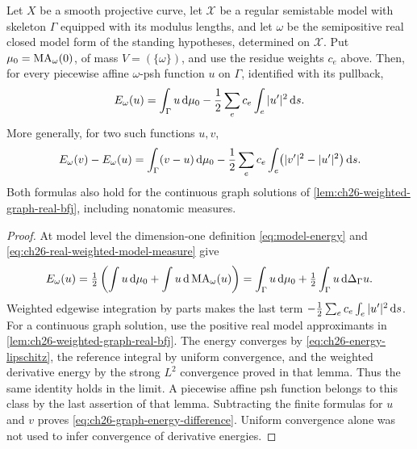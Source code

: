 \begin{proposition}
\label{prop:ch26-graph-energy}
Let \(X\) be a smooth projective curve, let \(\mathcal X\) be a regular
semistable model with skeleton \(\Gamma\) equipped with its modulus lengths,
and let \(\omega\) be the semipositive real closed model form of the
standing hypotheses, determined on \(\mathcal X\).  Put
\(\mu_0=\operatorname{MA}_\omega(0)\), of mass \(V=(\{\omega\})\), and use the
residue weights \(c_e\) above.  Then, for every piecewise affine
\(\omega\)-psh function \(u\) on \(\Gamma\), identified with its pullback,
\begin{equation}
\label{eq:ch26-graph-energy}
 E_\omega(u)=\int_\Gamma u\,\mathrm d\mu_0
             -\frac12\sum_e c_e\int_e|u'|^2\,\mathrm d s .
\end{equation}
More generally, for two such functions \(u,v\),
\begin{equation}
\label{eq:ch26-graph-energy-difference}
 E_\omega(v)-E_\omega(u)
 =\int_\Gamma(v-u)\,\mathrm d\mu_0
  -\frac12\sum_e c_e\int_e\bigl(|v'|^2-|u'|^2\bigr)\,\mathrm d s .
\end{equation}
Both formulas also hold for the continuous graph solutions of
\cref{lem:ch26-weighted-graph-real-bfj}, including nonatomic measures.
\end{proposition}

\begin{proof}
At model level the dimension-one definition \eqref{eq:model-energy} and
\eqref{eq:ch26-real-weighted-model-measure} give
\[
 E_\omega(u)=\tfrac12\left(\int u\,\mathrm d\mu_0+
                          \int u\,\mathrm d\operatorname{MA}_\omega(u)\right)
 =\int_\Gamma u\,\mathrm d\mu_0+\tfrac12\int_\Gamma u\,\mathrm d\Delta_\Gamma u.
\]
Weighted edgewise integration by parts makes the last term
\(-\tfrac12\sum_e c_e\int_e|u'|^2\,\mathrm d s\).
For a continuous graph solution, use the positive real model
approximants in \cref{lem:ch26-weighted-graph-real-bfj}.
The energy converges by \eqref{eq:ch26-energy-lipschitz}, the reference
integral by uniform convergence, and the weighted derivative energy by
the strong \(L^2\) convergence proved in that lemma.  Thus the same
identity holds in the limit.  A piecewise affine psh function belongs
to this class by the last assertion of that lemma.  Subtracting the
finite formulas for \(u\) and \(v\) proves
\eqref{eq:ch26-graph-energy-difference}.  Uniform convergence alone was
not used to infer convergence of derivative energies.
\end{proof}


